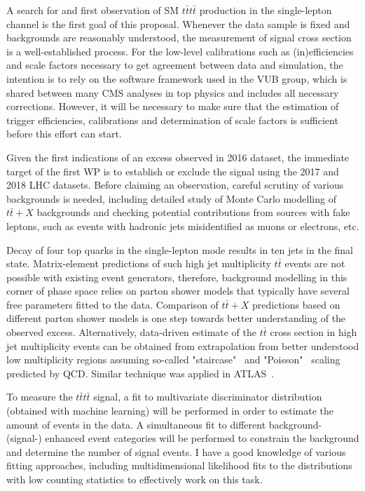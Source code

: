 
A search for and first observation of SM $t\bar{t}t\bar{t}$ production in the single-lepton channel is the first goal of this proposal. 
Whenever the data sample is fixed and backgrounds are reasonably understood, the measurement of signal cross section is a well-established process. For the low-level calibrations such as (in)efficiencies and scale factors necessary to get agreement between data and simulation, the intention is to rely on the software framework used in the VUB group, which is shared between many CMS analyses in top physics and includes all necessary corrections. However, it will be necessary to make sure that the estimation of trigger efficiencies, calibrations and determination of scale factors is sufficient before this effort can start.

Given the first indications of an excess observed in 2016 dataset, the immediate target of the first WP is to establish or exclude the signal using the 2017 and 2018 LHC datasets.  
Before claiming an observation, careful scrutiny of various backgrounds is needed, including detailed study of Monte Carlo modelling of $t\bar{t}+X$ backgrounds and checking potential contributions from sources with fake leptons, such as events with hadronic jets misidentified as muons or electrons, etc. 

Decay of four top quarks in the single-lepton mode results in ten jets in the final state. Matrix-element predictions of such high jet multiplicity $t\bar{t}$ events are not possible with existing event generators, therefore, background modelling in this corner of phase space relies on parton shower models that typically have several free parameters fitted to the data. Comparison of $t\bar{t}+X$ predictions based on different parton shower models is one step towards better understanding of the observed excess. Alternatively, data-driven estimate of the $t\bar{t}$ cross section in high jet multiplicity events can be obtained from extrapolation from better understood low multiplicity regions assuming so-called "staircase"~\cite{Ellis:1985vn} and "Poisson"~\cite{Gerwick:2012hq} scaling predicted by QCD. Similar technique was applied in ATLAS~\cite{Aaboud:2017faq}.

To measure the $t\bar{t}t\bar{t}$ signal, a fit to multivariate discriminator distribution (obtained with machine learning) will be performed in order to estimate the amount of \fourtop events in the data. A simultaneous fit to different background- (signal-) enhanced event categories will be performed to constrain the background and determine the number of signal events. I have a good knowledge of various fitting approaches, including multidimensional likelihood fits to the distributions with low counting statistics to effectively work on this task.

